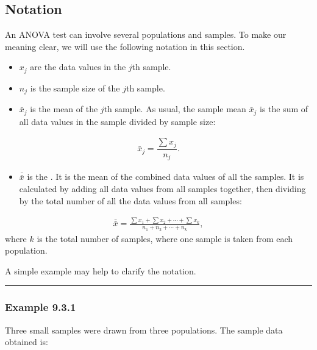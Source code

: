 \documentclass[letterpaper,10pt,english]{jupyterBook}
\begin{document}
\subsection{Notation}
\label{\detokenize{Ch9 Hypothesis Tests of Two or More Populations/9.3 ANOVA:notation}}
\sphinxAtStartPar
An ANOVA test can involve several populations and samples. To make our meaning clear, we will use the following notation in this section.
\begin{itemize}
\item {} 
\sphinxAtStartPar
\(x_j\) are the data values in the \(j\)th sample.

\item {} 
\sphinxAtStartPar
\(n_j\) is the sample size of the \(j\)th sample.

\item {} 
\sphinxAtStartPar
\(\bar{x}_j\) is the mean of the \(j\)th sample. As usual, the sample mean \(\bar{x}_j\) is the sum of all data values in the sample divided by sample size:

\end{itemize}
\begin{equation*}
\begin{split}\bar{x}_j = \dfrac{\sum x_j}{n_j}.\end{split}
\end{equation*}\begin{itemize}
\item {} 
\sphinxAtStartPar
\(\bar{\bar{x}}\) is the . It is the mean of the combined data values of all the samples. It is calculated by adding all data values from all samples together, then dividing by the total number of all the data values from all samples:

\end{itemize}
\begin{equation*}
\begin{split}\bar{\bar{x}} = \frac{\sum x_1 + \sum x_2 + \cdots + \sum x_k}{n_1 + n_2 + \cdots + n_k},\end{split}
\end{equation*}
\sphinxAtStartPar
where \(k\) is the total number of samples, where one sample is taken from each population.

\sphinxAtStartPar
A simple example may help to clarify the notation.


\bigskip\hrule\bigskip



\subsubsection{Example 9.3.1}
\label{\detokenize{Ch9 Hypothesis Tests of Two or More Populations/9.3 ANOVA:example-9-3-1}}
\sphinxAtStartPar
Three small samples were drawn from three populations. The sample data obtained is:
\end{document}
